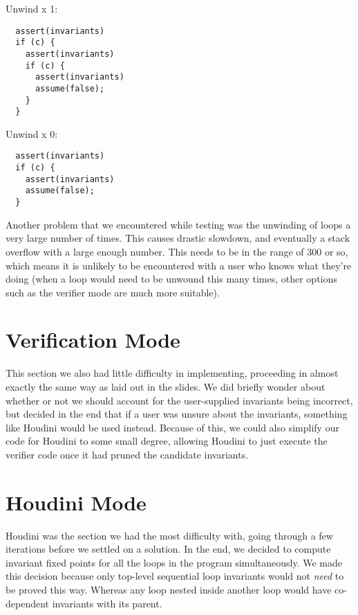 \documentclass[11pt]{article}
\begin{document}
\vspace{\baselineskip}

Unwind x 1:
\begin{verbatim}
  assert(invariants)
  if (c) {
    assert(invariants)
    if (c) {
      assert(invariants)
      assume(false);
    }
  }
\end{verbatim}

\vspace{\baselineskip}

Unwind x 0:
\begin{verbatim}
  assert(invariants)
  if (c) {
    assert(invariants)
    assume(false);
  }
\end{verbatim}

Another problem that we encountered while testing was the unwinding of loops a very large number of times. This causes drastic slowdown, and eventually a stack overflow with a large enough number. This needs to be in the range of 300 or so, which means it is unlikely to be encountered with a user who knows what they're doing (when a loop would need to be unwound this many times, other options such as the verifier mode are much more suitable). \\

\section{Verification Mode}

This section we also had little difficulty in implementing, proceeding in almost exactly the same way as laid out in the slides. We did briefly wonder about whether or not we should account for the user-supplied invariants being incorrect, but decided in the end that if a user was unsure about the invariants, something like Houdini would be used instead. Because of this, we could also simplify our code for Houdini to some small degree, allowing Houdini to just execute the verifier code once it had pruned the candidate invariants. \\

\section{Houdini Mode}

Houdini was the section we had the most difficulty with, going through a few iterations before we settled on a solution. In the end, we decided to compute invariant fixed points for all the loops in the program simultaneously. We made this decision because only top-level sequential loop invariants would not \emph{need} to be proved this way. Whereas any loop nested inside another loop would have co-dependent invariants with its parent. \\
\end{document}
